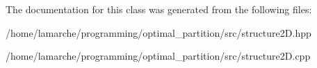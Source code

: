 The documentation for this class was generated from the following files\-:\begin{DoxyCompactItemize}
\item 
/home/lamarche/programming/optimal\-\_\-partition/src/structure2\-D.\-hpp\item 
/home/lamarche/programming/optimal\-\_\-partition/src/structure2\-D.\-cpp\end{DoxyCompactItemize}
